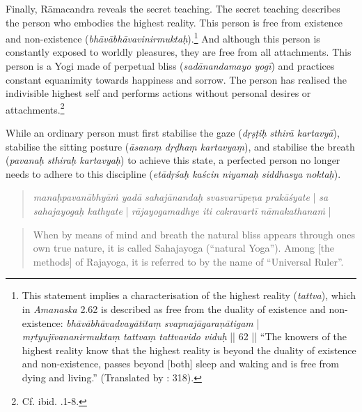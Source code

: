 Finally, Rāmacandra reveals the secret teaching. The secret teaching describes the person who embodies the highest reality. This person is free from existence and non-existence (\textit{bhāvābhāvavinirmuktaḥ}).\footnote{This statement implies a characterisation of the highest reality (\textit{tattva}), which in \emph{Amanaska} 2.62 is described as free from the duality of existence and non-existence: \textit{bhāvābhāvadvayātītaṃ svapnajāgaraṇātigam} | \textit{mṛtyujīvananirmuktaṃ tattvaṃ tattvavido viduḥ} || 62 || ``The knowers of the highest reality know that the highest reality is beyond the duality of existence and non-existence, passes beyond [both] sleep and waking and is free from dying and living.'' (Translated by \citeauthor{birch2013}: 318).} And although this person is constantly exposed to worldly pleasures, they are free from all attachments. This person is a Yogi made of perpetual bliss (\textit{sadānandamayo yogī}) and practices constant equanimity towards happiness and sorrow. The person has realised the indivisible highest self and performs actions without personal desires or attachments.\footnote{Cf. ibid. .1-8.}

While an ordinary person must first stabilise the gaze (\textit{dṛṣṭiḥ sthirā kartavyā}), stabilise the sitting posture (\textit{āsanaṃ dṛḍhaṃ kartavyaṃ}), and stabilise the breath (\textit{pavanaḥ sthiraḥ kartavyaḥ}) to achieve this state, a perfected person no longer needs to adhere to this discipline (\textit{etādṛśaḥ kaścin niyamaḥ siddhasya noktaḥ}).
\begin{quote}
  \textit{manaḥpavanābhyāṁ yadā sahajānandaḥ svasvarūpeṇa prakāśyate} | \textit{sa sahajayogaḥ kathyate} | \textit{rājayogamadhye iti cakravartī nāmakathanaṁ} |
\end{quote}

\begin{quote}
  When by means of mind and breath the natural bliss appears through ones own true nature, it is called Sahajayoga (``natural Yoga''). Among [the methods] of Rajayoga, it is referred to by the name of ``Universal Ruler''.
\end{quote}


